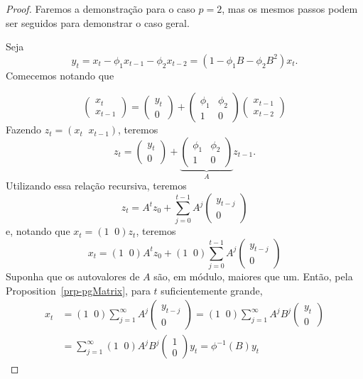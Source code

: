 \documentclass[
  letterpaper,
  DIV=11,
  numbers=noendperiod]{scrartcl}
\theoremstyle{definition}
\theoremstyle{definition}
\theoremstyle{plain}
\theoremstyle{plain}
\theoremstyle{remark}
\begin{document}
\begin{proof}
Faremos a demonstração para o caso \(p=2\), mas os mesmos passos podem
ser seguidos para demonstrar o caso geral.

Seja \[y_t=x_t-\phi_1x_{t-1}-\phi_2 x_{t-2}=(1-\phi_1B-\phi_2 B^2)x_t.\]
Comecemos notando que

\[\left(\begin{array}{c} x_t \\ x_{t-1}\end{array}\right)=\left(\begin{array}{c} y_t \\ 0\end{array}\right)+\left(\begin{array}{cc} \phi_1 & \phi_2 \\ 1 & 0\end{array}\right)\left(\begin{array}{c} x_{t-1} \\ x_{t-2}\end{array}\right)\]
Fazendo \(z_t=(x_t\;\;x_{t-1})\), teremos
\[z_t=\left(\begin{array}{c} y_t \\ 0\end{array}\right)+\underbrace{\left(\begin{array}{cc} \phi_1 & \phi_2 \\ 1 & 0\end{array}\right)}_{A}z_{t-1}.\]
Utilizando essa relação recursiva, teremos
\[z_t=A^t z_{0}+\sum_{j=0}^{t-1}A^j\left(\begin{array}{c} y_{t-j} \\ 0\end{array}\right)\]
e, notando que \(x_t=(1\;\;0)z_t\), teremos
\[x_t=(1\;\;0)A^t z_{0}+(1\;\;0)\sum_{j=0}^{t-1}A^j\left(\begin{array}{c} y_{t-j} \\ 0\end{array}\right)\]
Suponha que os autovalores de \(A\) são, em módulo, maiores que um.
Então, pela Proposition~\ref{prp-pgMatrix}, para \(t\) suficientemente
grande,
\begin{align}x_t&=(1\;\;0)\sum_{j=1}^\infty A^j \left(\begin{array}{c} y_{t-j} \\ 0\end{array}\right)=(1\;\;0)\sum_{j=1}^\infty A^j B^j\left(\begin{array}{c} y_{t} \\ 0\end{array}\right)\\&=\sum_{j=1}^\infty (1\;\;0)A^j B^j\left(\begin{array}{c} 1 \\ 0\end{array}\right)y_{t}=\phi^{-1}(B)y_t\end{align}

\end{proof}
\end{document}
